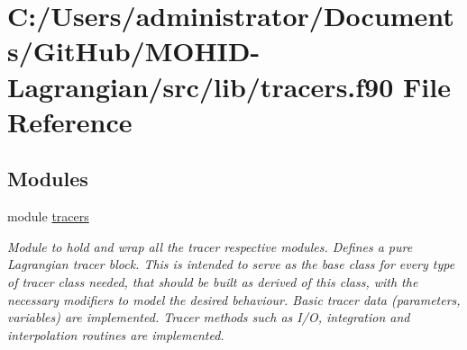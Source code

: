 \hypertarget{tracers_8f90}{}\section{C\+:/\+Users/administrator/\+Documents/\+Git\+Hub/\+M\+O\+H\+I\+D-\/\+Lagrangian/src/lib/tracers.f90 File Reference}
\label{tracers_8f90}
\subsection*{Modules}
\begin{DoxyCompactItemize}
\item 
module \hyperlink{namespacetracers}{tracers}
\begin{DoxyCompactList}\small\item\em Module to hold and wrap all the tracer respective modules. Defines a pure Lagrangian tracer block. This is intended to serve as the base class for every type of tracer class needed, that should be built as derived of this class, with the necessary modifiers to model the desired behaviour. Basic tracer data (parameters, variables) are implemented. Tracer methods such as I/O, integration and interpolation routines are implemented. \end{DoxyCompactList}\end{DoxyCompactItemize}
